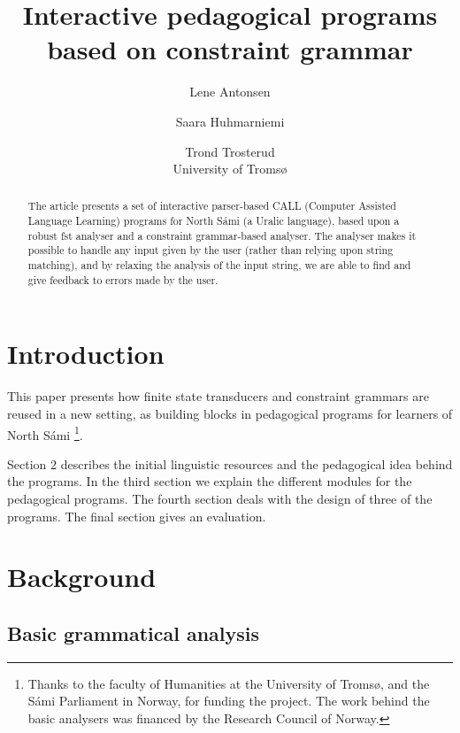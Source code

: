 \documentclass[11pt]{article}
\begin{document}
\title{Interactive pedagogical programs based on constraint grammar}

\author{Lene Antonsen  \and
              Saara Huhmarniemi \and Trond Trosterud \\ University of Tromsø}

 
\maketitle

\begin{abstract}
The article presents a set of interactive parser-based CALL (Computer Assisted Language Learning) programs for North Sámi (a Uralic language), based upon a robust fst analyser and a constraint grammar-based analyser. The analyser makes it possible to handle any input given by the user (rather than relying upon string matching), and by relaxing the analysis of the input string, we are able to find and give feedback to errors made by the user. 
\end{abstract}

\section{Introduction}
This paper presents how finite state transducers and constraint grammars are reused in a new setting, as building blocks in pedagogical programs for learners of North Sámi \footnote{Thanks to the faculty of Humanities at the University of Tromsø, and the Sámi Parliament in Norway, for funding the project. The work behind the basic analysers was financed by the Research Council of Norway.}. 

Section 2 describes the initial linguistic resources and the pedagogical idea behind the programs. In the third section we explain the different modules for the pedagogical programs. The fourth section deals with the design of three of the programs. The final section gives an evaluation.


\section{Background}

\subsection{Basic grammatical analysis}
\end{document}
